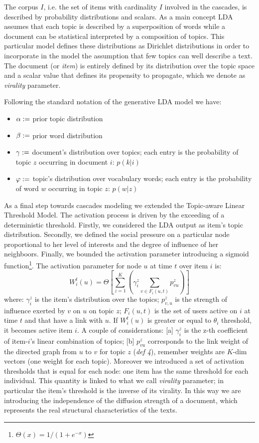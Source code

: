 The corpus $I$, i.e. the set of items with cardinality $I$ involved in the cascades, is described by probability distributions and scalars. As a main concept LDA assumes that each topic is described by a superposition of words while a document can be statistical interpreted by a composition of topics. This particular model defines these distributions as Dirichlet distributions in order to incorporate in the model the assumption that few topics can well describe a text. The document (or \textit{item}) is entirely defined by its distribution over the topic space and a scalar value that defines its propensity to propagate, which we denote as \textit{virality} parameter.

Following the standard notation of the generative LDA model we have:
\begin{itemize}
\item $\bold{\alpha}:=$ prior topic distribution
\item $\bold{\beta}:=$ prior word distribution
\item $\bold{\gamma}:= $ document's distribution over topics; each entry is the probability of topic $z$ occurring in document $i$: $p(k|i)$
\item $\bold{\varphi}:=$ topic's distribution over vocabulary words; each entry is the probability of word $w$ occurring in topic $z$: $p(w|z)$ 
\end{itemize} 

As a final step towards cascades modeling we extended the Topic-aware Linear Threshold Model. The activation process is driven by the exceeding of a deterministic threshold. Firstly, we considered the LDA output as item's topic distribution. Secondly, we defined the social pressure on a particular node proportional to her level of interests and the degree of influence of her neighboors. Finally, we bounded the activation parameter introducing a sigmoid function\footnote{$\Theta(x)=1/(1+e^{-x})$}. The activation parameter for node $u$ at time $t$ over item $i$ is:
\begin{equation}
W_i^t (u)= \Theta \left[ \sum_{z=1}^K \left(  \gamma_i^z \sum_{v \in F_{i}(u,t)} p_{vu}^z \right) \right]
\end{equation}
where:
$\gamma_i^z$ is the item's distribution over the topics;
$p_{v,u}^z$ is the strength of influence exerted by $v$ on $u$ on topic $z$;
$F_{i}(u,t)$ is the set of users active on $i$ at time $t$ and that have a link with $u$. If $W_i^t(u)$ is greater or equal to $\theta_i$ threshold, it becomes active item $i$. A couple of considerations: [a] $\gamma_i^z$ is the z-th coefficient of item-$i$'s linear combination of topics; [b] $p_{vu}^z$ corresponds to the link weight of the directed graph from $u$ to $v$ for topic $z$ (\textit{def 4}), remember weights are $K$-dim vectors (one weight for each topic).
Moreover we introduced a set of activation thresholds that is equal for each node: one item has the same threshold for each individual. This quantity is linked to what we call \textit{virality} parameter; in particular the item's threshold is the inverse of its virality. In this way we are introducing the independence of the diffusion strength of a document, which represents the real structural characteristics of the texts. 

